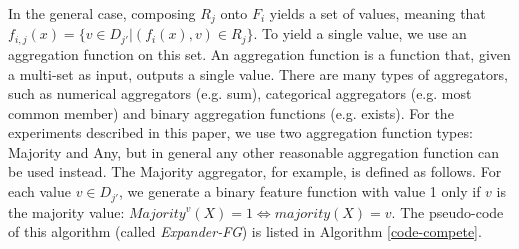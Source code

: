 \documentclass[twoside,11pt]{article}
\theoremstyle{definition}
\begin{document}

In the general case, composing $R_j$ onto $F_i$ yields a set of values, meaning that $f_{i,j}(x)=\{v\in D_{j'}|(f_i(x),v)\in R_j\}$. 
To yield a single value, we use an aggregation function on this set.
An aggregation function is a function that, given a multi-set as input, outputs a single value. There are many types of aggregators, such as numerical aggregators (e.g. sum), categorical aggregators (e.g. most common member) and binary aggregation functions (e.g. exists).
For the experiments described in this paper, we use  
 two aggregation function types: Majority and Any, but in general any other reasonable aggregation function can be used instead.
The Majority aggregator, for example, is defined as follows.  For each value $v\in D_{j'}$, we generate a binary feature function with value 1 only if $v$ is the majority value: 
$Majority^v(X)=1 \iff majority(X)=v$.
The pseudo-code of this algorithm (called   
\emph{Expander-FG}) is listed in Algorithm \ref{code-compete}.

\end{document}
